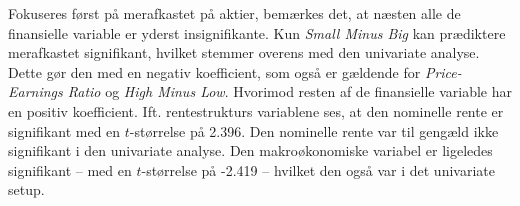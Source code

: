 \documentclass[
  a4paper,
  oneside]{memoir}
\begin{document}
Fokuseres først på merafkastet på aktier, bemærkes det, at næsten alle de finansielle variable er yderst insignifikante. Kun \emph{Small Minus Big} kan prædiktere merafkastet signifikant, hvilket stemmer overens med den univariate analyse. Dette gør den med en negativ koefficient, som også er gældende for \emph{Price-Earnings Ratio} og \emph{High Minus Low}. Hvorimod resten af de finansielle variable har en positiv koefficient. Ift. rentestrukturs variablene ses, at den nominelle rente er signifikant med en \(t\)-størrelse på 2.396. Den nominelle rente var til gengæld ikke signifikant i den univariate analyse. Den makroøkonomiske variabel er ligeledes signifikant -- med en \(t\)-størrelse på -2.419 -- hvilket den også var i det univariate setup.

\begin{table}[H]


\end{table}
\end{document}
